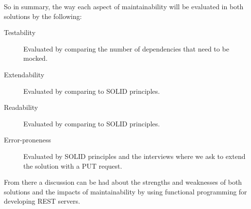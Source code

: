 So in summary, the way each aspect of maintainability will be evaluated in both
solutions by the following:

\begin{description}
    \item [Testability] Evaluated by comparing the number of dependencies that
    need to be mocked. 
    \item [Extendability] Evaluated by comparing to SOLID principles.
    \item [Readability] Evaluated by comparing to SOLID principles.
    \item [Error-proneness] Evaluated by SOLID principles and the interviews
        where we ask to extend the solution with a PUT request.
\end{description}

From there a discussion can be had about the strengths and weaknesses of both
solutions and the impacts of maintainability by using functional programming for
developing REST servers.





